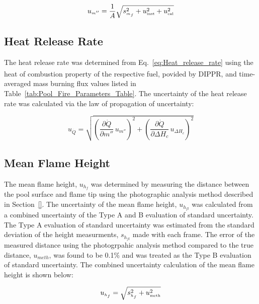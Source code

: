 \documentclass[12pt]{article}
\begin{document}
\begin{equation}
\label{eq:mass_flux_uncertainty}
u_{\scriptscriptstyle m''} = \frac{1}{A}\sqrt{s_{\scriptscriptstyle m_{f}}^2+u_{\rm \scriptscriptstyle inst}^2+u_{\rm \scriptscriptstyle cal}^2}
\end{equation}
 
\subsection{Heat Release Rate}
\label{ssec:Heat_Release_Rate}
The heat release rate was determined from Eq.~\ref{eq:Heat_release_rate} using the heat of combustion property of the respective fuel, povided by DIPPR\textsuperscript{\textregistered}, and time-averaged mass burning flux values listed in Table~\ref{tab:Pool_Fire_Parameters_Table}. The uncertainty of the heat release rate was calculated via the law of propagation of uncertainty:

\begin{equation}
\label{eq:heat_release_rate_uncertainty}
u_{\scriptscriptstyle \dot{Q}} = \sqrt{{\left(\frac{\partial \dot{Q}}{\partial m''}\,u_{\scriptscriptstyle m''} \right)}^2+{\left(\frac{\partial \dot{Q}}{\partial \Delta H_{c}}\,u_{\scriptscriptstyle \Delta H_{c}} \right)}^2}
\end{equation}

\subsection{Mean Flame Height}
\label{ssec:Mean_Flame_Height}
The mean flame height, $u_{h_{f}}$ was determined by measuring the distance between the pool surface and flame tip using the photographic analysis method described in Section~\ref{}. The uncertainty of the mean flame height, $u_{\scriptscriptstyle h_{fl}}$ was calculated from a combined uncertainty of the Type A and B evaluation of standard uncertainty. The Type A evaluation of standard uncertainty was estimated from the standard deviation of the height measurments, $s_{\scriptscriptstyle h_{fl}}$ made with each frame. The error of the measured distance using the photogrpahic analysis method compared to the true distance, $u_{\scriptscriptstyle meth}$,  was found to be 0.1\% and was treated as the Type B evaluation of standard uncertainty. The combined uncertainty calculation of the mean flame height is shown below:

\begin{equation}
\label{eq:mean_flame_height}
u_{\scriptscriptstyle h_{f}} = \sqrt{s_{\scriptscriptstyle{h_{f}}}^2+u_{\rm \scriptscriptstyle meth}^2}
\end{equation}

\pagebreak
\end{document}
